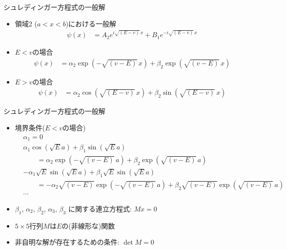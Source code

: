 \begin{frame}[t,fragile]{シュレディンガー方程式の一般解}
  \begin{itemize}
  \item 領域2 ($a < x < b$)における一般解
    \begin{align*}
      \psi(x) &= A_2 e^{i\sqrt{(E-v)}\,x} + B_1 e^{-i\sqrt{(E-v)}\,x}
    \end{align*}
  \item $E < v$の場合
    \begin{align*}
      \psi(x) &= \alpha_2 \exp(-\sqrt{(v-E)}\,x) + \beta_2 \exp(\sqrt{(v-E)}\,x)
    \end{align*}
  \item $E > v$の場合
    \begin{align*}
      \psi(x) &= \alpha_2 \cos(\sqrt{(E-v)}\,x) + \beta_2 \sin(\sqrt{(E-v)}\,x)
    \end{align*}
  \end{itemize}
\end{frame}

\begin{frame}[t,fragile]{シュレディンガー方程式の一般解}
  \begin{itemize}
  \item 境界条件($E < v$の場合)
    \begin{align*}
      &\alpha_1 = 0 \\
      &\alpha_1 \cos(\sqrt{E}a) + \beta_1 \sin(\sqrt{E}a) \\
      & \qquad =
      \alpha_2 \exp(-\sqrt{(v-E)}\,a) + \beta_2 \exp(\sqrt{(v-E)}\,a) \\
      &-\alpha_1 \sqrt{E} \sin(\sqrt{E}a) + \beta_1 \sqrt{E} \sin(\sqrt{E}a) \\
      & \qquad =
      - \alpha_2 \sqrt{(v-E)} \exp(-\sqrt{(v-E)}\,a) + \beta_2 \sqrt{(v-E)} \exp(\sqrt{(v-E)}\,a) \\
      &\cdots
    \end{align*}
  \item $\beta_1$, $\alpha_2$, $\beta_2$, $\alpha_3$, $\beta_3$ に関する連立方程式: $M x = 0$
  \item $5 \times 5$行列$M$は$E$の(非線形な)関数
  \item 非自明な解が存在するための条件: $\det M=0$
  \end{itemize}
\end{frame}
